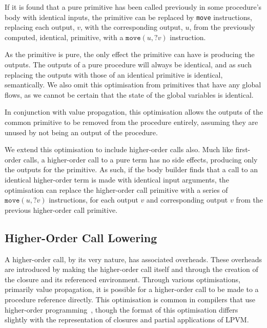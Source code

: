 If it is found that a pure primitive has been called previously in some procedure's body with identical inputs, the primitive can be replaced by \texttt{move} instructions, replacing each output, $v$, with the corresponding output, $u$, from the previously computed, identical, primitive, with a $\mathtt{move}(u, ?v)$ instruction. 

As the primitive is pure, the only effect the primitive can have is producing the outputs. The outputs of a pure procedure will always be identical, and as such replacing the outputs with those of an identical primitive is identical, semantically. We also omit this optimisation from primitives that have any global flows, as we cannot be certain that the state of the global variables is identical.

In conjunction with value propagation, this optimisation allows the outputs of the common primitive to be removed from the procedure entirely, assuming they are unused by not being an output of the procedure. 

We extend this optimisation to include higher-order calls also. Much like first-order calls, a higher-order call to a pure term has no side effects, producing only the outputs for the primitive. As such, if the body builder finds that a call to an identical higher-order term is made with identical input arguments, the optimisation can replace the higher-order call primitive with a series of $\mathtt{move}(u, ?v)$ instructions, for each output $v$ and corresponding output $v$ from the previous higher-order call primitive.

\subsection{Higher-Order Call Lowering}
\label{ssec:higher-call-lowering}

A higher-order call, by its very nature, has associated overheads. These overheads are introduced by making the higher-order call itself and through the creation of the closure and its referenced environment. Through various optimisations, primarily value propagation, it is possible for a higher-order call to be made to a procedure reference directly. This optimisation is common in compilers that use higher-order programming~\cite{keep2012optimizing}, though the format of this optimisation differs slightly with the representation of closures and partial applications of LPVM.

